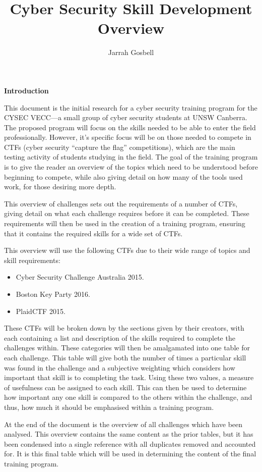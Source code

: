 \documentclass[twoside,a4paper,11pt]{report}
\author{Jarrah Gosbell}
\title{Cyber Security Skill Development Overview}
\makeatletter
\newcommand\frontmatter{%
    \cleardoublepage
  \pagenumbering{roman}}
\newcommand\mainmatter{%
    \cleardoublepage
  \pagenumbering{arabic}}
\newenvironment{multipleabstract}[1]
  {\renewcommand{\abstractname}{#1}\newpage\begin{abstract}\thispagestyle{plain}}
  {\end{abstract}}
\renewenvironment{abstract}{%
    \begin{center}%
      {\bfseries \vspace{5em}\abstractname\vspace{.5em}\vspace{\z@}}%
    \end{center}%
}
\makeatother
\begin{document}
\frontmatter
\maketitle
\tableofcontents
	\listoftables
\begin{multipleabstract}{Introduction}
	This document is the initial research for a cyber security training program for the CYSEC VECC---a small group of cyber security students at UNSW Canberra. 
	The proposed program will focus on the skills needed to be able to enter the field professionally.
	However, it's specific focus will be on those needed to compete in CTFs (cyber security ``capture the flag'' competitions), 
	which are the main testing activity of students studying in the field. 
	The goal of the training program is to give the reader an overview of the topics which need to be understood before beginning to compete, 
	while also giving detail on how many of the tools used work, for those desiring more depth. 

	This overview of challenges sets out the requirements of a number of CTFs, 
	giving detail on what each challenge requires before it can be completed. 
	These requirements will then be used in the creation of a training program, 
	ensuring that it contains the required skills for a wide set of CTFs. 

	This overview will use the following CTFs due to their wide range of topics and skill requirements:
	\begin{itemize}
		\item Cyber Security Challenge Australia 2015.
		\item Boston Key Party 2016.
		\item PlaidCTF 2015.
	\end{itemize}
	These CTFs will be broken down by the sections given by their creators, 
	with each containing a list and description of the skills required to complete the challenges within. 
	These categories will then be amalgamated into one table for each challenge. 
	This table will give both the number of times a particular skill was found in the challenge and a subjective weighting which considers how important that skill is to completing the task. 
	Using these two values, a measure of usefulness can be assigned to each skill. 
	This can then be used to determine how important any one skill is compared to the others within the challenge, and thus, how much it should be emphasised within a training program.

	At the end of the document is the overview of all challenges which have been analysed. 
	This overview contains the same content as the prior tables, but it has been condensed into a single reference with all duplicates removed and accounted for. 
	It is this final table which will be used in determining the content of the final training program. 
\end{multipleabstract}
\mainmatter
\end{document}
